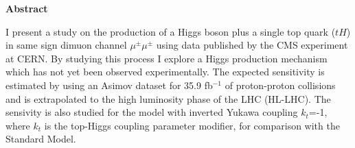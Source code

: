 \thispagestyle{empty}
\vspace*{2.2cm}
\begin{center}
	\Large \textbf{Abstract}
\end{center} 
\vspace{1.5cm}


I present a study on the production of a Higgs boson plus a single top quark ($tH$) in same sign dimuon channel $\mu^\pm \mu^\pm$ using data published by the CMS experiment at CERN. By studying this
process I explore a Higgs production mechanism which has not yet been observed
experimentally. The expected sensitivity is estimated by using an Asimov dataset for 35.9 fb$^{-1}$ of proton-proton collisions and is extrapolated to the  high luminosity phase of the LHC (HL-LHC).
The sensivity is also studied for the model with inverted Yukawa coupling $k_t$=-1, where $k_t$ is the top-Higgs coupling parameter modifier, for comparison with the Standard Model.
